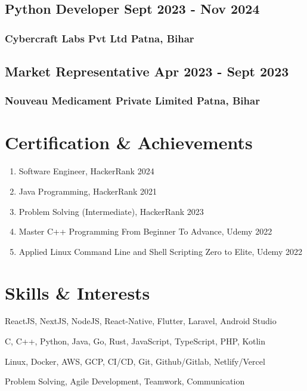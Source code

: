 \documentclass[11pt]{article}
\begin{document}
\subsection{Python Developer \hfill Sept 2023 - Nov 2024}
\subsubsection{Cybercraft Labs Pvt Ltd \hfill Patna, Bihar}
\vspace{8pt}
\subsection{Market Representative \hfill Apr 2023 - Sept 2023}
\subsubsection{Nouveau Medicament Private Limited \hfill Patna, Bihar}

\vspace{18pt}

\section{Certification \& Achievements}
\begin{enumerate}[label=\null, left=0pt..0pt, itemsep=0pt]
	\item Software Engineer, HackerRank \hfill 2024
	\item Java Programming, HackerRank \hfill 2021
	\item Problem Solving (Intermediate), HackerRank \hfill 2023
	\item Master C++ Programming From Beginner To Advance, Udemy \hfill 2022
	\item Applied Linux Command Line and Shell Scripting Zero to Elite, Udemy \hfill 2022
\end{enumerate}

\section{Skills \& Interests}
\begin{description}[itemsep=0pt]
	\item[Frameworks \& Stacks] ReactJS, NextJS, NodeJS, React-Native, Flutter, Laravel, Android Studio
	\item[Programming] C, C++, Python, Java, Go, Rust, JavaScript, TypeScript, PHP, Kotlin
	\item[DevOps] Linux, Docker, AWS, GCP, CI/CD, Git, Github/Gitlab, Netlify/Vercel
  \item[Soft-Skills] Problem Solving, Agile Development, Teamwork, Communication
\end{description}
\end{document}
